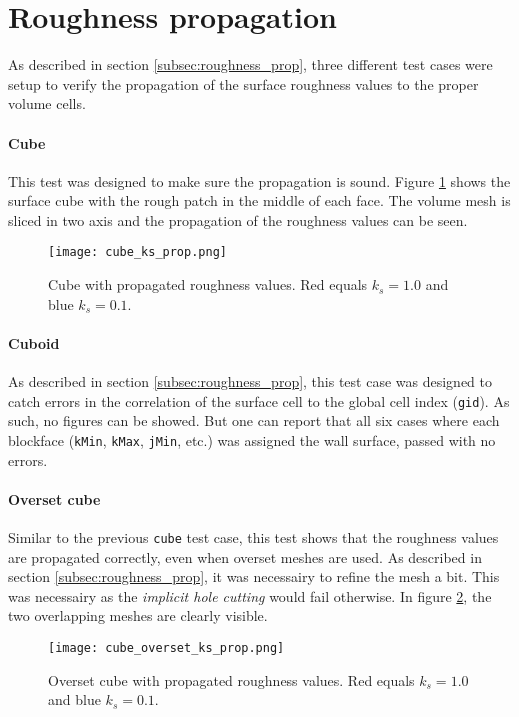 \section{Roughness propagation}
As described in section \ref{subsec:roughness_prop}, three different test cases were setup to verify the
propagation of the surface roughness values to the proper volume cells.

\paragraph{Cube}
This test was designed to make sure the propagation is sound. Figure
\ref{fig:cube_ks_prop} shows the surface cube with the rough patch in the middle
of each face. The volume mesh is sliced in two axis and the propagation of the
roughness values can be seen.

\begin{figure}[H] \centering
\texttt{[image: cube\_ks\_prop.png]}
    \caption{Cube with propagated roughness values. Red equals
$k_{s} = 1.0$ and blue $k_{s} = 0.1$.}
    \label{fig:cube_ks_prop}
\end{figure}

\paragraph{Cuboid}
As described in section \ref{subsec:roughness_prop}, this test case was designed
to catch errors in the correlation of the surface cell to the global cell index
(\texttt{gid}). As such, no figures can be showed. But one can report that all
six cases where each blockface (\texttt{kMin}, \texttt{kMax}, \texttt{jMin},
etc.) was assigned the wall surface, passed with no errors.

\paragraph{Overset cube}
Similar to the previous \texttt{cube} test case, this test shows that the roughness
values are propagated correctly, even when overset meshes are used. As described
in section \ref{subsec:roughness_prop}, it was necessairy to refine the mesh a
bit. This was necessairy as the \textit{implicit hole cutting} would fail
otherwise. In figure \ref{fig:cube_overset_ks_prop}, the two overlapping meshes
are clearly visible.

\begin{figure}[H] \centering
\texttt{[image: cube\_overset\_ks\_prop.png]}
    \caption{Overset cube with propagated roughness values. Red equals
$k_{s} = 1.0$ and blue $k_{s} = 0.1$.}
    \label{fig:cube_overset_ks_prop}
\end{figure}
